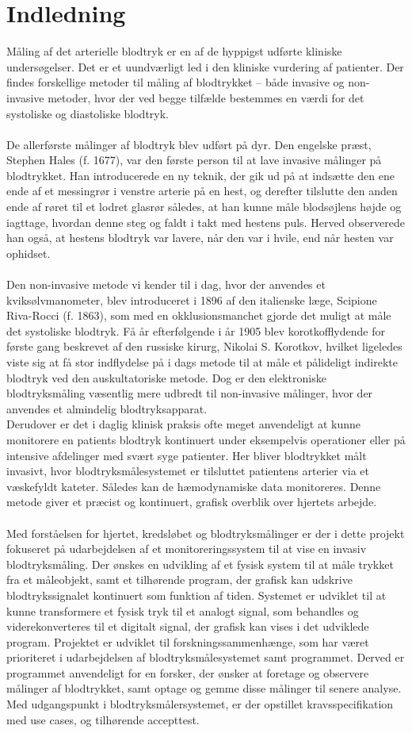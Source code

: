 \chapter{Indledning}
Måling af det arterielle blodtryk er en af de hyppigst udførte kliniske undersøgelser. Det er et uundværligt led i den kliniske vurdering af patienter. Der findes forskellige metoder til måling af blodtrykket – både invasive og non-invasive metoder, hvor der ved begge tilfælde bestemmes en værdi for det systoliske og diastoliske blodtryk. \\\\
De allerførste målinger af blodtryk blev udført på dyr. Den engelske præst, Stephen Hales (f. 1677), var den første person til at lave invasive målinger på blodtrykket. Han introducerede en ny teknik, der gik ud på at indsætte den ene ende af et messingrør i venstre arterie på en hest, og derefter tilslutte den anden ende af røret til et lodret glasrør således, at han kunne måle blodsøjlens højde og iagttage, hvordan denne steg og faldt i takt med hestens puls. Herved observerede han også, at hestens blodtryk var lavere, når den var i hvile, end når hesten var ophidset. \\\\
Den non-invasive metode vi kender til i dag, hvor der anvendes et kviksølvmanometer, blev introduceret i 1896 af den italienske læge, Scipione Riva-Rocci (f. 1863), som med en okklusionsmanchet gjorde det muligt at måle det systoliske blodtryk. Få år efterfølgende i år 1905 blev korotkofflydende for første gang beskrevet af den russiske kirurg, Nikolai S. Korotkov, hvilket ligeledes viste sig at få stor indflydelse på i dags metode til at måle et pålideligt indirekte blodtryk ved den auskultatoriske metode. Dog er den elektroniske blodtryksmåling væsentlig mere udbredt til non-invasive målinger, hvor der anvendes et almindelig blodtryksapparat. \\
Derudover er det i daglig klinisk praksis ofte meget anvendeligt at kunne monitorere en patients blodtryk kontinuert under eksempelvis operationer eller på intensive afdelinger med svært syge patienter. Her bliver blodtrykket målt invasivt, hvor blodtryksmålesystemet er tilsluttet patientens arterier via et væskefyldt kateter. Således kan de hæmodynamiske data monitoreres. Denne metode giver et præcist og kontinuert, grafisk overblik over hjertets arbejde. \\\\
Med forståelsen for hjertet, kredsløbet og blodtryksmålinger er der i dette projekt fokuseret på udarbejdelsen af et monitoreringssystem til at vise en invasiv blodtryksmåling. Der ønskes en udvikling af et fysisk system til at måle trykket fra et måleobjekt, samt et tilhørende program, der grafisk kan udskrive blodtrykssignalet kontinuert som funktion af tiden. Systemet er udviklet til at kunne transformere et fysisk tryk til et analogt signal, som behandles og viderekonverteres til et digitalt signal, der grafisk kan vises i det udviklede program. Projektet er udviklet til forskningssammenhænge, som har været prioriteret i udarbejdelsen af blodtryksmålesystemet samt programmet. Derved er programmet anvendeligt for en forsker, der ønsker at foretage og observere målinger af blodtrykket, samt optage og gemme disse målinger til senere analyse. 
Med udgangspunkt i blodtryksmålersystemet, er der opstillet kravsspecifikation med use cases, og tilhørende accepttest. 
